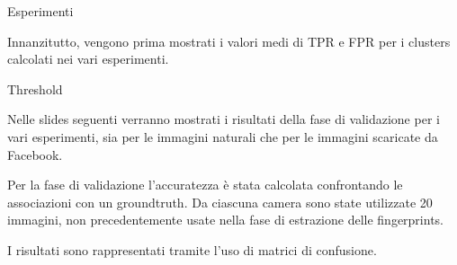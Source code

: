 \begin{tframe}{Esperimenti}

Innanzitutto, vengono prima mostrati i valori medi di TPR e FPR per i clusters calcolati nei vari esperimenti.

\begin{table}[ht]
\centering %
\label{table:nonlin} %
\end{table}

\end{tframe}

\begin{tframe}{Threshold}

Nelle slides seguenti verranno mostrati i risultati della fase di validazione per i vari esperimenti, sia per le immagini naturali che per le immagini scaricate da Facebook.

\vspace{0.1in}

Per la fase di validazione l'accuratezza è stata calcolata confrontando le associazioni con un groundtruth. Da ciascuna camera sono state utilizzate 20 immagini, non precedentemente usate nella fase di estrazione delle fingerprints.

\vspace{0.1in}

I risultati sono rappresentati tramite l'uso di matrici di confusione.

\end{tframe}

